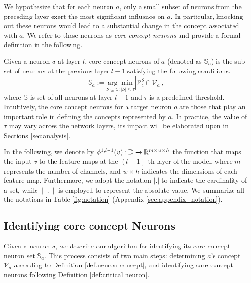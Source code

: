 We hypothesize that for each neuron $a$, only a small subset of neurons from the preceding layer exert the most significant influence on $a$. In particular, knocking out these neurons would lead to a substantial change in the concept associated with $a$. We refer to these neurons as \emph{core concept neurons} and provide a formal definition in the following.


\begin{mydef}
\label{def:critical neuron} Given a neuron $a$ at layer $l$, core concept neurons of $a$ (denoted as $\mathbb{S}_a$) is the sub-set of neurons at the previous layer $l - 1$ satisfying the following conditions:
    \begin{equation}
    \label{eq:critical neurons}
        \mathbb{S}_a := \underset{S \subseteq \mathbb{S};\left|{S}\right| \leq \tau}{\arg \min} \left| \mathcal{V}^{\overline{{S}}}_a \cap \mathcal{V}_a \right|,
    \end{equation}
    where $\mathbb{S}$ is set of all neurons at layer $l-1$ and $\tau$ is a predefined threshold. 
    Intuitively, the core concept neurons for a target neuron $a$ are those that play an important role in defining the concepts represented by $a$.
    In practice, the value of $\tau$ may vary across the network layers, its impact will be elaborated upon in Sections \ref{sec:analysis}.
\end{mydef}    
In the following, we denote by  $\phi^{1, l-1}(v): {\mathbb{D}} \xrightarrow{} {\mathbb{R}}^{m\times w \times h}$ the function that maps the input $v$ to the feature maps at the $(l-1)$-th layer of the model, where $m$ represents the number of channels, and $w \times h$ indicates the dimensions of each feature map. Furthermore, we adopt the notation $|.|$ to indicate the cardinality of a set, while $\|.\|$ is employed to represent the absolute value.
We summarize all the notations in Table \ref{fig:notation} (Appendix \ref{sec:appendix_notation}).

\subsection{Identifying core concept Neurons}
\label{subsec:identify_node}
Given a neuron $a$, we describe our algorithm for identifying its core concept neuron set $\mathbb{S}_a$. This process consists of two main steps: determining $a$'s concept $\mathcal{V}_a$ according to Definition \ref{def:neuron concept}, and identifying core concept neurons following Definition \ref{def:critical neuron}. 

